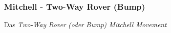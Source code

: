 \subsubsection{Mitchell - Two-Way Rover (Bump)}

\noindent
Das \textit{Two-Way Rover (oder Bump) Mitchell Movement}
